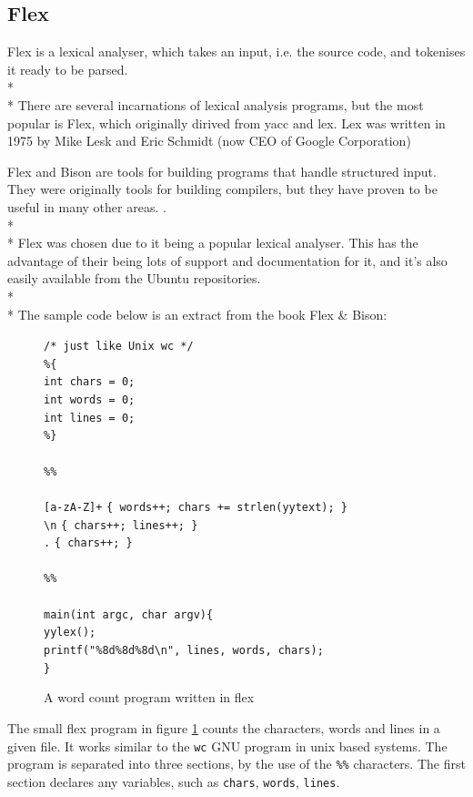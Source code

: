 \documentclass[12pt]{report}
\begin{document}
\subsection{Flex}\label{subsec:flex}
Flex is a lexical analyser, which takes an input, i.e. the source code, and tokenises it ready to be parsed.\\*
\\*
There are several incarnations of lexical analysis programs, but the most popular is Flex, which originally dirived from yacc and lex.  Lex was written in 1975 by Mike Lesk and Eric Schmidt (now CEO of Google Corporation)

Flex and Bison are tools for building programs that handle structured input.  They were originally tools for building compilers, but they have proven to be useful in many other areas. \citep{flexandbison09}.
\\*
\\*
Flex was chosen due to it being a popular lexical analyser.  This has the advantage of their being lots of support and documentation for it, and it's also easily available from the Ubuntu repositories.\\*
\\*
The sample code below is an extract from the book Flex \& Bison:
\begin{figure}[H]
	\begin{tabbing}
	\texttt{/* just like Unix wc */}\\
	\texttt{\%\{}\\
	\texttt{int chars = 0;}\\
	\texttt{int words = 0;}\\
	\texttt{int lines = 0;}\=\\
	\texttt{\%\}}\\
	\\
	\texttt{\%\%}
	\\
	\\
	\texttt{[a-zA-Z]+} \> \texttt{\{ words++; chars += strlen(yytext); \}}\\
	\texttt{\textbackslash n} \> \texttt{\{ chars++; lines++; \}}\\
	\texttt{.} \> \texttt{\{ chars++; \}}
	\\
	\\
	\texttt{\%\%}
	\\
	\\
	\texttt{main(int argc, char \*\*argv)\{}\\
	\> \texttt{yylex();}\\
	\> \texttt{printf("\%8d\%8d\%8d\textbackslash n", lines, words, chars);}\\
	\texttt{\}}
	\end{tabbing}
	\caption{A word count program written in flex}\label{fig:flexwc}
	\citep{flexandbison09}
\end{figure}
The small flex program in figure \ref{fig:flexwc} counts the characters, words and lines in a given file.  It works similar to the \texttt{wc} GNU program in unix based systems.  The program is separated into three sections, by the use of the \texttt{\%\%} characters.  The first section declares any variables, such as \texttt{chars}, \texttt{words}, \texttt{lines}.  
\end{document}
